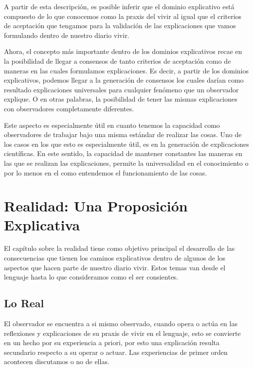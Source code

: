 \documentclass[10pt]{article}
\begin{document}
        A partir de esta descripción, es posible inferir que el dominio explicativo está compuesto de lo que conocemos como la praxis del vivir al igual que el criterios de aceptación que tengamos para la validación de las explicaciones que vamos formulando dentro de nuestro diario vivir.  

        Ahora, el concepto más importante dentro de los dominios explicativos recae en la posibilidad de llegar a consensos de tanto criterios de aceptación como de maneras en las cuales formulamos explicaciones. Es decir, a partir de los dominios explicativos, podemos llegar a la generación de consensos los cuales darían como resultado explicaciones universales para cualquier fenómeno que un observador explique. O en otras palabras, la posibilidad de tener las mismas explicaciones con observadores completamente diferentes.

        Este aspecto es especialmente útil en cuanto tenemos la capacidad como observadores de trabajar bajo una misma estándar de realizar las cosas. Uno de los casos en los que esto es especialmente útil, es en la generación de explicaciones científicas. En este sentido, la capacidad de mantener constantes las maneras en las que se realizan las explicaciones, permite la universalidad en el conocimiento o por lo menos en el como entendemos el funcionamiento de las cosas.

    \section{Realidad: Una Proposición Explicativa}

    El capítulo sobre la realidad tiene como objetivo principal el desarrollo de las consecuencias que tienen los caminos explicativos dentro de algunos de los aspectos que hacen parte de nuestro diario vivir. Estos temas van desde el lenguaje hasta lo que consideramos como el ser consientes.

        \subsection{Lo Real}

        El observador se encuentra a si mismo observado, cuando opera o actúa en las reflexiones y explicaciones de su praxis de vivir en el lenguaje, esto se convierte en un hecho por su experiencia a priori, por esto una explicación resulta secundario respecto a su operar o actuar. Las experiencias de primer orden acontecen discutamos o no de ellas.
\end{document}
